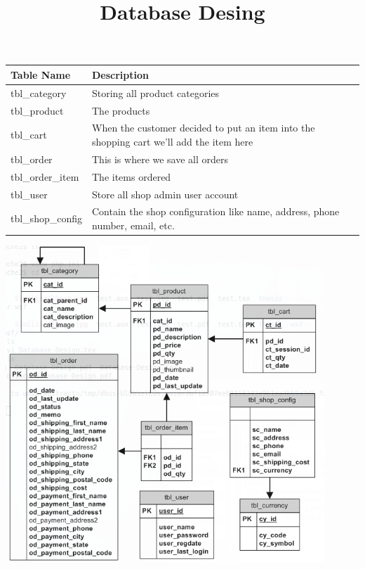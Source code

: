 \documentclass{report}
\begin{document}
\title{Database Desing}
\maketitle

\begin{table}[h]
\begin{tabular}{| l | p{12cm} |}
	\hline
	Table Name & Description  \\
	\hline
	tbl\_category & Storing all product categories  \\
	\hline
	tbl\_product & The products  \\
	\hline
	tbl\_cart & When the customer decided to put an item into the shopping cart we'll add the item here  \\
	\hline
	tbl\_order & This is where we save all orders  \\
	\hline
	tbl\_order\_item & The items ordered  \\
	\hline
	tbl\_user & Store all shop admin user account  \\
	\hline
	tbl\_shop\_config & Contain the shop configuration like name, address, phone number, email, etc.  \\
	\hline
\end{tabular}
\end{table}
\includegraphics[width=120mm]{databaseDesign.png}
\end{document}
